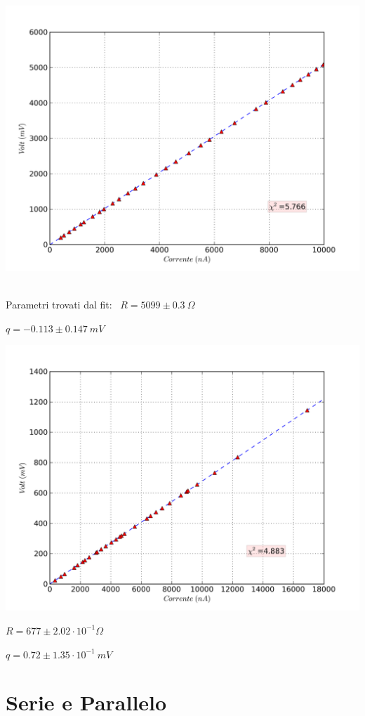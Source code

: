 \includegraphics[scale=0.75]{grafici/C1/res1.png}
\

Parametri trovati dal fit: \
$R= 5099 \pm 0.3 \ \Omega$

$q = -0.113 \pm 0.147\ mV$


\includegraphics[scale=0.75]{grafici/C1/res2.png}

$R = 677 \pm 2.02\cdot 10^{-1} \Omega$

$q = 0.72 \pm 1.35\cdot 10^{-1} \ mV $
\

\section{Serie e Parallelo}


